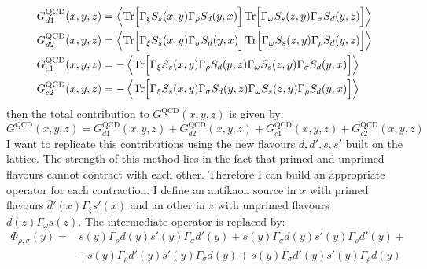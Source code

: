 \documentclass[english, LaM, oneside, noexaminfo]{sapthesis}
\newcommand{\la}{\langle}
\newcommand{\ra}{\rangle}
\newcommand{\tr}{\text{Tr}}
\begin{document}
\begin{equation}\label{eq:wick-contractions-general}
    \begin{split}
        & G_{d1}^\text{QCD}(x,y,z) = \left\la \tr \Big[ \Gamma_\xi S_{s} (x,y) \Gamma_\rho S_{d} (y,x) \Big] \hspace*{.5mm} \tr \Big[ \Gamma_\omega S_{s} (z,y) \Gamma_\sigma S_{d} (y,z) \Big] \right\ra \\
        & G_{d2}^\text{QCD}(x,y,z) = \left\la \tr \Big[ \Gamma_\xi S_{s} (x,y) \Gamma_\sigma S_{d} (y,x) \Big] \hspace*{.5mm} \tr \Big[ \Gamma_\omega S_{s} (z,y) \Gamma_\rho S_{d} (y,z) \Big] \right\ra \\
        & G_{c1}^\text{QCD}(x,y,z) = - \left\la \tr \Big[ \Gamma_\xi S_{s} (x,y) \Gamma_\rho S_{d} (y,z) \Gamma_\omega S_{s} (z,y) \Gamma_\sigma S_{d} (y,x) \Big] \right\ra \\
        & G_{c2}^\text{QCD}(x,y,z) = - \left\la \tr \Big[ \Gamma_\xi S_{s} (x,y) \Gamma_\sigma S_{d} (y,z) \Gamma_\omega S_{s} (z,y) \Gamma_\rho S_{d} (y,x) \Big] \right\ra \\
    \end{split}
\end{equation}
then the total contribution to $G^\text{QCD}(x,y,z)$ is given by:
\begin{equation*}
    G^\text{QCD}(x,y,z) = G_{d1}^\text{QCD}(x,y,z) + G_{d2}^\text{QCD}(x,y,z) + G_{c1}^\text{QCD}(x,y,z) + G_{c2}^\text{QCD}(x,y,z)
\end{equation*}
I want to replicate this contributions using the new flavours $d,d',s,s'$ built on the lattice.
The strength of this method lies in the fact that primed and unprimed flavours cannot contract with each other.
Therefore I can build an appropriate operator for each contraction.
I define an antikaon source in $x$ with primed flavours $\bar d' (x) \Gamma_\xi s'(x)$ and an other in $z$ with unprimed flavours $\bar d (z) \Gamma_\omega s(z)$.
The intermediate operator is replaced by: 
\begin{equation*}
    \begin{aligned}
        \Phi_{\rho,\sigma}(y) = 
        & \bar s(y) \Gamma_\rho d(y) \bar s'(y) \Gamma_\sigma d'(y) + \bar s(y) \Gamma_\sigma d(y) \bar s'(y) \Gamma_\rho d'(y) + \\
        & + \bar s(y) \Gamma_\rho d'(y) \bar s'(y) \Gamma_\sigma d(y) + \bar s(y) \Gamma_\sigma d'(y) \bar s'(y) \Gamma_\rho d(y)
    \end{aligned}
\end{equation*}
\end{document}
